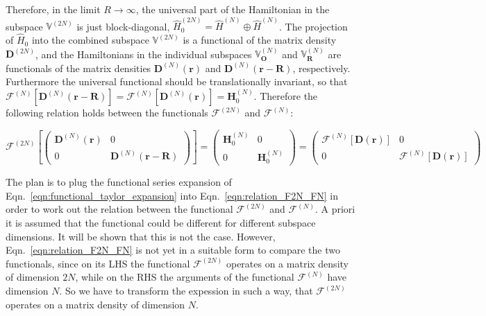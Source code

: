 \documentclass[journal=jpclcd,manuscript=letter]{achemso}
\newcommand\m[1]{\mathbf{#1}}
\renewcommand\vec[1]{\mathbf{#1}}
\begin{document}
Therefore, in the limit $R \to \infty$, the universal part of the Hamiltonian in the subspace $\mathbb{V}^{(2 N)}$ is just block-diagonal, $\hat{H}^{(2N)}_0 = \hat{H}^{(N)} \oplus \hat{H}^{(N)}$. The projection of $\hat{H}_0$ into the combined subspace $\mathbb{V}^{(2N)}$ is a functional of the matrix density $\m{D}^{(2N)}$, and the Hamiltonians in the individual subspaces $\mathbb{V}^{(N)}_{\vec{O}}$ and $\mathbb{V}^{(N)}_{\vec{R}}$ are functionals of the matrix densities $\m{D}^{(N)}(\vec{r})$ and $\m{D}^{(N)}(\vec{r}-\vec{R})$, respectively. Furthermore the universal functional should be translationally invariant, so that $\m{\mathcal{F}}^{(N)}[\m{D}^{(N)}(\vec{r}-\vec{R})] = \m{\mathcal{F}}^{(N)}[\m{D}^{(N)}(\vec{r})] = \m{H}^{(N)}_0$. Therefore the following relation holds between the functionals $\m{\mathcal{F}}^{(2N)}$ and $\m{\mathcal{F}}^{(N)}$:

\begin{equation}
  \m{\mathcal{F}}^{(2N)}
  \left[
    \begin{pmatrix}
      \m{D}^{(N)}(\vec{r}) & 0 \\
      0 & \m{D}^{(N)}(\vec{r}-\vec{R})
    \end{pmatrix}
    \right]
  =
  \begin{pmatrix}
    \m{H}^{(N)}_{0} & 0 \\
    0 & \m{H}^{(N)}_{0}
  \end{pmatrix}
  =
  \begin{pmatrix}
    \m{\mathcal{F}}^{(N)}[\m{D}(\vec{r})] & 0 \\
    0 & \m{\mathcal{F}}^{(N)}[\m{D}(\vec{r})]
  \end{pmatrix} \label{eqn:relation_F2N_FN}
\end{equation}

The plan is to plug the functional series expansion of Eqn.~\ref{eqn:functional_taylor_expansion} into Eqn.~\ref{eqn:relation_F2N_FN} in order to work out the relation between the functional $\m{\mathcal{F}}^{(2N)}$ and $\m{\mathcal{F}}^{(N)}$. A priori it is assumed that the functional could be different for different subspace dimensions. It will be shown that this is not the case. However, Eqn.~\ref{eqn:relation_F2N_FN} is not yet in a suitable form to compare the two functionals, since on its LHS the functional $\m{\mathcal{F}}^{(2N)}$ operates on a matrix density of dimension $2N$, while on the RHS the arguments of the functional $\m{\mathcal{F}}^{(N)}$ have dimension $N$. So we have to transform the expession in such a way, that $\m{\mathcal{F}}^{(2N)}$ operates on a matrix density of dimension $N$.
\end{document}

